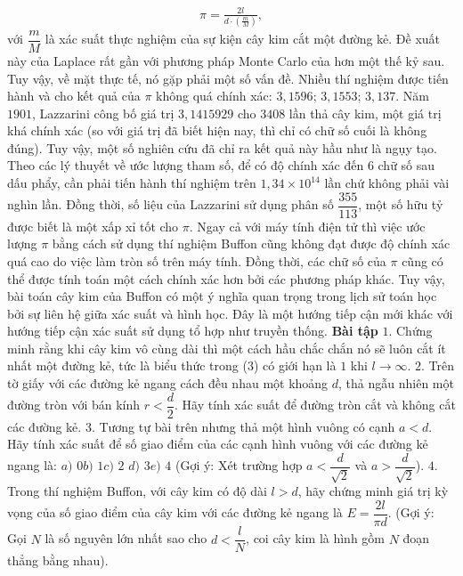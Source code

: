 \begin{multicols}{2}
	\begin{align*}
		\pi = \frac{2l}{d\cdot\left(\frac{m}{M}\right)},
	\end{align*}
	với $\dfrac{m}{M}$ là xác suất thực nghiệm của sự kiện cây kim cắt một đường kẻ.
	\vskip 0.1cm
	Đề xuất này của Laplace rất gần với phương pháp Monte Carlo của hơn một thế kỷ sau. Tuy vậy, về mặt thực tế, nó gặp phải một số vấn đề. Nhiều thí nghiệm được tiến hành và cho kết quả của $\pi$ không quá chính xác: $3{,}1596$; $3{,}1553$; $3{,}137$.
	\vskip 0.1cm 
	Năm $1901$, Lazzarini công bố giá trị $3{,}1415929$ cho $3408$ lần thả cây kim, một giá trị khá chính xác (so với giá trị đã biết hiện nay, thì chỉ có chữ số cuối là không đúng). Tuy vậy, một số nghiên cứu đã chỉ ra kết quả này hầu như là ngụy tạo. Theo các lý thuyết về ước lượng tham số, để có độ chính xác đến $6$ chữ số sau dấu phẩy, cần phải tiến hành thí nghiệm trên $1{,}34\times10^{14}$ lần chứ không phải vài nghìn lần. Đồng thời, số liệu của Lazzarini sử dụng phân số $\dfrac{355}{113}$, một số hữu tỷ được biết là một xấp xỉ tốt cho $\pi$. 
	\vskip 0.1cm
	Ngay cả với máy tính điện tử thì việc ước lượng $\pi$ bằng cách sử dụng thí nghiệm Buffon cũng không đạt được độ chính xác quá cao do việc làm tròn số trên máy tính. Đồng thời, các chữ số của $\pi$ cũng có thể được tính toán một cách chính xác hơn bởi các phương pháp khác.
	\vskip 0.1cm
	Tuy vậy, bài toán cây kim của Buffon có một ý nghĩa quan trọng trong lịch sử toán học bởi sự liên hệ giữa xác suất và hình học. Đây là một hướng tiếp cận mới khác với hướng tiếp cận xác suất sử dụng tổ hợp như truyền thống.
	\vskip 0.1cm
	\textbf{\color{toanhocdoisong}Bài tập}
	\vskip 0.1cm
	$1$. Chứng minh rằng khi cây kim vô cùng dài thì một cách hầu chắc chắn nó sẽ luôn cắt ít nhất một đường kẻ, tức là biểu thức trong ($3$) có giới hạn là $1$ khi $l\to \infty$.
	\vskip 0.1cm
	$2$. Trên tờ giấy với các đường kẻ ngang cách đều nhau một khoảng  $d$, thả ngẫu nhiên một đường tròn với bán kính $r < \dfrac{d}{2}$. Hãy tính xác suất để đường tròn cắt và không cắt các đường kẻ.
	\vskip 0.1cm
	$3$. Tương tự bài trên nhưng thả một hình vuông có cạnh $a<d$. Hãy tính xác suất để số giao điểm của các cạnh hình vuông với các đường kẻ ngang là:
	\vskip 0.1cm
	$a)$ $0$\quad\quad		$b)$ $1$\quad\quad		$c)$ $2$\quad\quad
	$d)$ $3$\quad\quad		$e)$ $4$
	\vskip 0.1cm
	(Gợi ý: Xét trường hợp $a<\dfrac{d}{\sqrt{2}}$ và $a> \dfrac{d}{\sqrt{2}}$).
	\vskip 0.1cm	
	$4$. Trong thí nghiệm Buffon, với cây kim có độ dài $l>d$, hãy chứng minh giá trị kỳ vọng của số giao điểm của cây kim với các đường kẻ ngang là $E = \dfrac{2l}{\pi d}$. (Gợi ý: Gọi $N$ là số nguyên lớn nhất sao cho $d<\dfrac{l}{N}$, coi cây kim là hình gồm $N$ đoạn thẳng bằng nhau).

\end{multicols}
